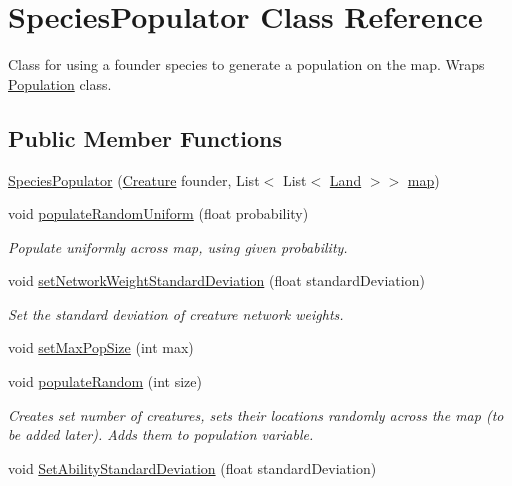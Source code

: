 \hypertarget{class_species_populator}{}\section{Species\+Populator Class Reference}
\label{class_species_populator}


Class for using a founder species to generate a population on the map. Wraps \mbox{\hyperlink{class_population}{Population}} class.  


\subsection*{Public Member Functions}
\begin{DoxyCompactItemize}
\item 
\mbox{\hyperlink{class_species_populator_aa3187e4e8906a10d15365aafddd183f4}{Species\+Populator}} (\mbox{\hyperlink{class_creature}{Creature}} founder, List$<$ List$<$ \mbox{\hyperlink{class_land}{Land}} $>$$>$ \mbox{\hyperlink{class_species_populator_a886b0f7ecb2a21621178d68b00d637e3}{map}})
\item 
void \mbox{\hyperlink{class_species_populator_ac76623f1bd486e6981c7f7382ca70f1e}{populate\+Random\+Uniform}} (float probability)
\begin{DoxyCompactList}\small\item\em Populate uniformly across map, using given probability. \end{DoxyCompactList}\item 
void \mbox{\hyperlink{class_species_populator_aecdf7b73ed1506c1c879268c357200e4}{set\+Network\+Weight\+Standard\+Deviation}} (float standard\+Deviation)
\begin{DoxyCompactList}\small\item\em Set the standard deviation of creature network weights. \end{DoxyCompactList}\item 
void \mbox{\hyperlink{class_species_populator_af1c39ba08b340e3b23f42f7a67fc826d}{set\+Max\+Pop\+Size}} (int max)
\item 
void \mbox{\hyperlink{class_species_populator_a6d9571023b9d9edd44e28a11e638b001}{populate\+Random}} (int size)
\begin{DoxyCompactList}\small\item\em Creates set number of creatures, sets their locations randomly across the map (to be added later). Adds them to population variable. \end{DoxyCompactList}\item 
void \mbox{\hyperlink{class_species_populator_ae1d2c7fc2142918304556b20a7f2f361}{Set\+Ability\+Standard\+Deviation}} (float standard\+Deviation)
\end{DoxyCompactItemize}
